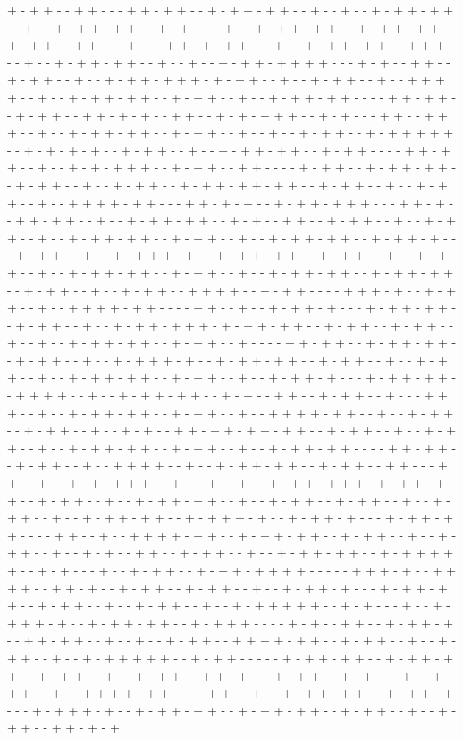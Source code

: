 + - + + - - + + - - - + + - + + - - + - + + - + + - - + - - + - - + - + + - + + - - + - - + - + + - + + - - + - + + - - + - - + - + + - + + - - + - + + - + + - - + - + + - - + + - - - + - - - + + - + - + + - + + - - + - + + - + + - - + + + - - - + - - + - + + - + + - - + - - + - - + - + + - + + + + - - - + - + - - + + - - + - + + - - + - - + - + + - + + + - + - + + - - + - - + - + + - - + - - + + + + - - + - - + - + + - + + - - + - + + - - + - - + - + + - + + - - - - + + - + + - - + - + + - - + + - + - + - - + + - - + - + - + + + - - + - + - - - + + - - + + + - - + - - + - + + - + + - - + - + + - - + - - + - - + - + + - - + - + + + + + - - + - + - + - + - - + - + + - - + - - + - + + - + + - - + - + + - - - - + + - + + - - + - - + - + - + + + - - + - + + - - + + - - - - + - + + - - + - + + - + + - - + - + + - - + - - + - + + - - + - + + - + + - + + - - + - + + - - + - - + - + + - - + - - + + + + - + + - - - + + - + - + - - + - + + - + + + - - - + + - + - - + + - + + - - + - - + - + + - + + - - + - + - - + + - - + - + + - - + - - + - + + - - + - - + - + + - + + - - + - + + - - + - - + - + + - + + - - + - + + - + - - - + - + + - - + - - + - + + + - + - - + - + + - + + - - + - + + - - + - - + - + + - - + - - + - + + - + + - - + - + + - - + - - + - + + - + + - - + - + + - + + - - + - + + - - + - - + - + + - - + + + + - - + - + + - - - - + + + - + - - + - + + - - + - - + + + + - + + - - - - + + - - + - - + - + + - + - - - + - + + - + + - - + - + + - - + - - + - + + - + + + - + - + + - + + - - + - + + - - + - + + - - + - - + - - + - + + - + + - - + - + + - - + - - - - + + - + + - - + - + + - + + - - + - + + - - + - - + - + + + - + - - + - + + - + + - - + - + + - - + - - + - + + - - + - - + - + + - + + - - + - + + - - + - - + - + + - + - - - + - + + - + + - - + + + + - - + - - + - + + - + + - - + - + - - + + - - + - + + - - + - - - + + + - - + - - + - + + - + + - - + - + + - - + - - + + + + - + + - - + - - + - + + - - + - + + - - + - - + - + - - + + - + + - + + - + + - - + - + + - - + - - + - + + - - + - - + - + + - + + - - + - + + - - + - - + - + + - + + - - - - + + - + + - - + - + + - - + - - + + + + - - + - - + - + + - + + - - + - + + - - + + - - - + + - - + - - + - + - + + + - - + - + + - - + - - + - + + - + + + - + - + + - + + - - + - + + - - + - - + - + + - + + - - + - - + - + + - - + - + + - - + - - + - + + - - + - - + - + + - + + - - + - + + + - + - - + - + + - + - - - + - + + - + + - - - - + + - - + - - + + + + - + + - - + - + + - + + - - + - + + - - + - - + - + + - - + - - + - + - - + + - - + - + + - - + - - + - + + - + + - - + - + + + + + - - + - + - - - + - - + - + + - - + - + + - + + + + - - - - - + + + - + - - + + + + - - + + - + - - + - + + - - + - + + - - + - - + - + + - + - - - + - + + - + + - - + - + + - - + - - + - + + - - + - - + - + + + + + - - + - + - - - + - - + - + + + - + - - + - + + - + + - - + - + + + - - - - + - + - - + + - - + - + + - + - - + + - + + - - + - - + - - + - + + - - + + + + - + + - - + - + + - - + - - + - + + - - + - - + - + + + + + - - + - + + - - - - - + - + + - + + - - + - + + - + + - - + - + + - - + - - + - + + - - + + - + - + + - + + - - + - + - - - + - - + - + + - - + - - + + + + - + + - - - - + + - - + - - + - + + - + + - - + - + + - + - - - + - + + + - + - - + - + + - + + - - + - + + - + + - - + - + + - - + - - + - + + - - + + - + - + 